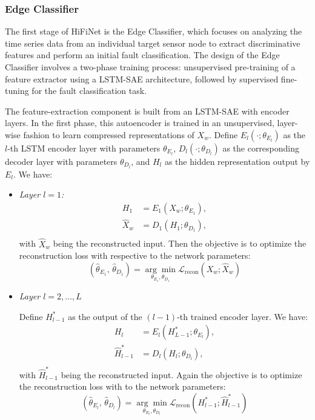 \subsubsection{Edge Classifier}
The first stage of HiFiNet is the Edge Classifier, which focuses on analyzing the time series data from an individual target sensor node to extract discriminative features and perform an initial fault classification. The design of the Edge Classifier involves a two-phase training process: unsupervised pre-training of a feature extractor using a LSTM-SAE architecture, followed by supervised fine-tuning for the fault classification task.

The feature-extraction component is built from an LSTM-SAE with encoder layers. In the first phase, this autoencoder is trained in an unsupervised, layer-wise fashion to learn compressed representations of \(X_w\). Define \(E_l(\cdot; \theta_{E_l})\) as the \(l\)-th LSTM encoder layer with parameters \(\theta_{E_l}\), \(D_l(\cdot; \theta_{D_l})\) as the corresponding decoder layer with parameters \(\theta_{D_l}\), and \(H_l\) as the hidden representation output by \(E_l\). We have:
\begin{itemize}
  \item \emph{Layer \(l=1\):}
    \begin{equation}
      \begin{aligned}
        H_1 &= E_1(X_w; \theta_{E_1}), \\
        \hat X_w &= D_1(H_1; \theta_{D_1}), \\
      \end{aligned}
    \end{equation}
    with \(\hat X_w\) being the reconstructed input. Then the objective is to optimize the reconstruction loss with respective to the network parameters:
    \begin{equation}
      (\hat \theta_{E_1},\,\hat \theta_{D_1}) = \underset{\theta_{E_1}, \theta_{D_1}} {\arg\min} \mathcal L_{\text{recon}}(X_w; \hat X_w)
    \end{equation}
  \item \emph{Layer \(l = 2, \ldots, L\)}

    Define \(H^*_{l-1}\) as the output of the \((l-1)\)-th trained encoder layer. We have:
    \begin{equation}
      \begin{aligned}
        H_l &= E_l(H^*_{L-1}; \theta_{E_l}), \\
        \hat H^*_{l-1} &= D_l(H_l; \theta_{D_l}), \\
      \end{aligned}
    \end{equation}
    with \(\hat H^*_{l-1}\) being the reconstructed input. Again the objective is to optimize the reconstruction loss with to the network parameters:
    \begin{equation}
      (\hat \theta_{E_l},\,\hat \theta_{D_l}) = \underset{\theta_{E_l}, \theta_{D_l}} {\arg\min} \mathcal L_{\text{recon}}(H^*_{l-1}; \hat H^*_{l-1})
    \end{equation}
\end{itemize}
